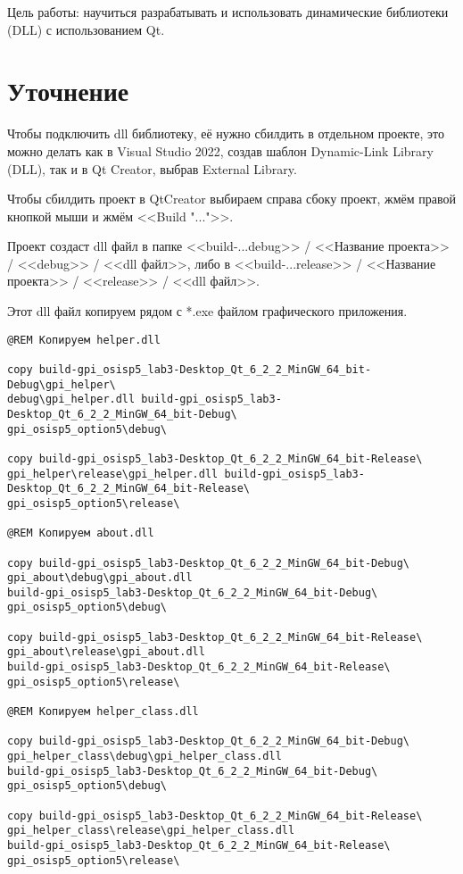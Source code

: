 
\tableofcontents
\thispagestyle{empty} %
\newpage


Цель работы:
научиться разрабатывать и использовать динамические библиотеки (DLL) с использованием Qt.


\section{Уточнение}

Чтобы подключить dll библиотеку, её нужно сбилдить в отдельном проекте, это можно делать как в Visual Studio 2022, 
создав шаблон Dynamic-Link Library (DLL), так и в Qt Creator, выбрав External Library.

Чтобы сбилдить проект в QtCreator выбираем справа сбоку проект,
жмём правой кнопкой мыши и жмём <<Build "...">>.

Проект создаст dll файл в папке <<build-...debug>> / <<Название проекта>> / <<debug>> / <<dll файл>>,
либо в <<build-...release>> / <<Название проекта>> / <<release>> / <<dll файл>>.

Этот dll файл копируем рядом с *.exe файлом графического приложения.

\begin{lstlisting}[numbers=none, name=gpi_copy_dll.bat]
@REM Копируем helper.dll

copy build-gpi_osisp5_lab3-Desktop_Qt_6_2_2_MinGW_64_bit-Debug\gpi_helper\
debug\gpi_helper.dll build-gpi_osisp5_lab3-Desktop_Qt_6_2_2_MinGW_64_bit-Debug\
gpi_osisp5_option5\debug\

copy build-gpi_osisp5_lab3-Desktop_Qt_6_2_2_MinGW_64_bit-Release\
gpi_helper\release\gpi_helper.dll build-gpi_osisp5_lab3-Desktop_Qt_6_2_2_MinGW_64_bit-Release\
gpi_osisp5_option5\release\

@REM Копируем about.dll

copy build-gpi_osisp5_lab3-Desktop_Qt_6_2_2_MinGW_64_bit-Debug\
gpi_about\debug\gpi_about.dll
build-gpi_osisp5_lab3-Desktop_Qt_6_2_2_MinGW_64_bit-Debug\
gpi_osisp5_option5\debug\

copy build-gpi_osisp5_lab3-Desktop_Qt_6_2_2_MinGW_64_bit-Release\
gpi_about\release\gpi_about.dll
build-gpi_osisp5_lab3-Desktop_Qt_6_2_2_MinGW_64_bit-Release\
gpi_osisp5_option5\release\

@REM Копируем helper_class.dll

copy build-gpi_osisp5_lab3-Desktop_Qt_6_2_2_MinGW_64_bit-Debug\
gpi_helper_class\debug\gpi_helper_class.dll
build-gpi_osisp5_lab3-Desktop_Qt_6_2_2_MinGW_64_bit-Debug\
gpi_osisp5_option5\debug\

copy build-gpi_osisp5_lab3-Desktop_Qt_6_2_2_MinGW_64_bit-Release\
gpi_helper_class\release\gpi_helper_class.dll
build-gpi_osisp5_lab3-Desktop_Qt_6_2_2_MinGW_64_bit-Release\
gpi_osisp5_option5\release\
\end{lstlisting}

